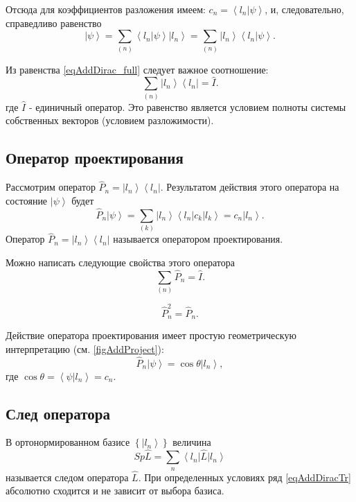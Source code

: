 Отсюда для коэффициентов разложения имеем:  
$c_n = \left< l_n \right| \left. \psi \right>$, и, следовательно,
справедливо равенство 
\begin{equation}  
\left| \psi \right> = \sum_{(n)} \left< l_n \right| \left. \psi
\right> \left| l_n \right> = 
\sum_{(n)} \left| l_n \right> \left< l_n \right| \left. \psi
\right>.
\label{eqAddDirac_full}
\end{equation}  

Из равенства \ref{eqAddDirac_full} следует важное соотношение:
\begin{equation}  
\sum_{(n)} \left| l_n \right> \left< l_n \right| = \hat{I}.
\label{eqAddDiracI}
\end{equation}  
где $\hat{I}$ -  единичный оператор. Это равенство является условием
полноты системы собственных векторов (условием разложимости). 

\subsection{Оператор проектирования}
\label{AddDiracProjector}

Рассмотрим оператор \(\hat{P}_n = \left| l_n \right> \left< l_n
\right|\). 
Результатом действия этого оператора на состояние 
\(\left| \psi \right>\) будет
\begin{equation}
\hat{P}_n \left| \psi \right> = \sum_{(k)} \left| l_n \right> \left<
l_n \right| c_k \left| l_k \right> = c_n \left| l_n \right>.
\label{eqDiracProektor}
\end{equation}
Оператор \(\hat{P}_n = \left| l_n \right> \left< l_n \right|\) называется
оператором проектирования.

Можно написать следующие свойства этого оператора
\begin{equation}  
\sum_{(n)} \hat{P}_n = \hat{I}.
\end{equation}  

\begin{equation}  
\hat{P}_n^2 = \hat{P}_n.
\end{equation}  


Действие оператора проектирования имеет простую геометрическую
интерпретацию  (см. \autoref{figAddProject}):
\[
\hat{P}_n\left|\psi\right> = \cos{\theta} \left|l_n\right>,
\]
где $\cos{\theta} = \left<\psi|l_n\right> = c_n$. 

\subsection{След оператора}
\label{AddDiracTrace}
В ортонормированном базисе \(\left\{\left|l_n\right>\right\}\) 
величина 
\begin{equation}  
Sp \hat{L} = \sum_n \left<l_n\right| \hat{L} \left|l_n\right>
\label{eqAddDiracTr}
\end{equation}  
называется следом оператора \(\hat{L}\). При определенных условиях
\cite{bTraceClassOperatorAdd1} ряд \ref{eqAddDiracTr}
абсолютно сходится и не зависит от выбора базиса.

